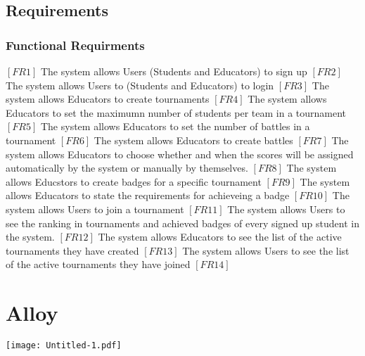 \documentclass{article}
\begin{document}
\subsection{Requirements}
\subsubsection{Functional Requirments}
$[FR1]$ The system allows Users (Students and Educators) to sign up
$[FR2]$ The system allows Users to (Students and Educators) to login
$[FR3]$ The system allows Educators to create tournaments
$[FR4]$ The system allows Educators to set the maximumn number of students per team in a tournament
$[FR5]$ The system allows Educators to set the number of battles in a tournament
$[FR6]$ The system allows Educators to create battles
$[FR7]$ The system allows Educators to choose whether and when the scores will be assigned automatically by the system or manually by themselves.
$[FR8]$ The system allows Educstors to create badges for a specific tournament
$[FR9]$ The system allows Educators to state the requirements for achieveing a badge
$[FR10]$ The system allows Users to join a tournament
$[FR11]$ The system allows Users to see the ranking in tournaments and achieved badges of every signed up student in the system.
$[FR12]$ The system allows Educators to see the list of the active tournaments they have created
$[FR13]$ The system allows Users to see the list of the active tournaments they have joined
$[FR14]$ 

\newpage

\section{Alloy}
\texttt{[image: Untitled-1.pdf]}
\end{document}
